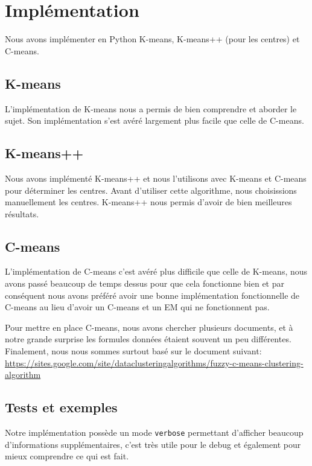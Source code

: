 \documentclass{article}
\begin{document}
  \section{Implémentation}

  Nous avons implémenter en Python K-means, K-means++ (pour les centres) et C-means.

  \subsection{K-means}

  L'implémentation de K-means nous a permis de bien comprendre et aborder le sujet.
  Son implémentation s'est avéré largement plus facile que celle de C-means.

  \subsection{K-means++}

  Nous avons implémenté K-means++ et nous l'utilisons avec K-means et C-means pour déterminer les centres.
  Avant d'utiliser cette algorithme, nous choisissions manuellement les centres.
  K-means++ nous permis d'avoir de bien meilleures résultats.


  \subsection{C-means}

  L'implémentation de C-means c'est avéré plus difficile que celle de K-means,
  nous avons passé beaucoup de temps dessus pour que cela fonctionne bien et
  par conséquent nous avons préféré avoir une bonne implémentation fonctionnelle
  de C-means au lieu d'avoir un C-means et un EM qui ne fonctionnent pas.

  Pour mettre en place C-means, nous avons chercher plusieurs documents, et
  à notre grande surprise les formules données étaient souvent un peu différentes.
  Finalement, nous nous sommes surtout basé sur le document suivant:\\
  \url{https://sites.google.com/site/dataclusteringalgorithms/fuzzy-c-means-clustering-algorithm}


  \subsection{Tests et exemples}

  Notre implémentation possède un mode \texttt{verbose} permettant d'afficher beaucoup
  d'informations supplémentaires, c'est très utile pour le debug et également pour mieux comprendre ce qui est fait.
\end{document}
